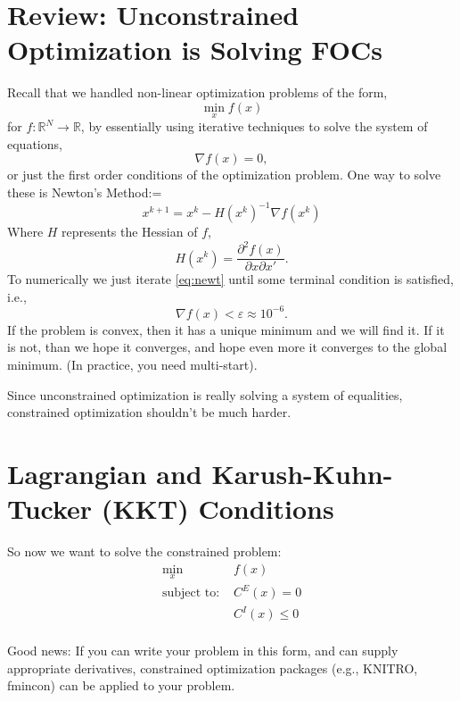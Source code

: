 \documentclass[twoside]{article}
\begin{document}

\section{Review: Unconstrained Optimization is Solving FOCs} \label{sec:unconstrained}

Recall that we handled non-linear optimization problems of the form,
$$ \min_x f(x) $$
for $f: \mathbb{R}^N \rightarrow \mathbb{R}$,
by essentially using iterative techniques to solve the system of equations,
$$ \nabla f(x) = 0,$$
or just the first order conditions of the optimization problem. One way to solve these is Newton's Method:=
\begin{equation} \label{eq:newt}
x^{k+1} = x^k - H(x^k)^{-1} \nabla f(x^k) 
\end{equation}
Where $H$ represents the Hessian of $f$, 
$$ H(x^k) = \frac{\partial^2 f(x)}{\partial x \partial x'}.$$
To numerically we just iterate \eqref{eq:newt} until some terminal condition is satisfied, i.e., 
$$ \nabla f(x) < \varepsilon \approx 10^{-6}. $$
If the problem is convex, then it has a unique minimum and we will find it. If it is not, than we hope it converges, and hope even 
more it converges to the global minimum. (In practice, you need multi-start). 

Since unconstrained optimization is really solving a system of equalities, constrained optimization shouldn't be much harder.

\section{Lagrangian and Karush-Kuhn-Tucker (KKT) Conditions}

So now we want to solve the constrained problem: 
\begin{align*}
\min_x & f(x) \\
\mbox{subject to: } & C^E(x) = 0 \\
& C^I(x) \leq 0 \\ 
\end{align*}

Good news: If you can write your problem in this form, and can supply appropriate derivatives, constrained optimization packages (e.g., KNITRO, fmincon)
can be applied to your problem.
\end{document}
